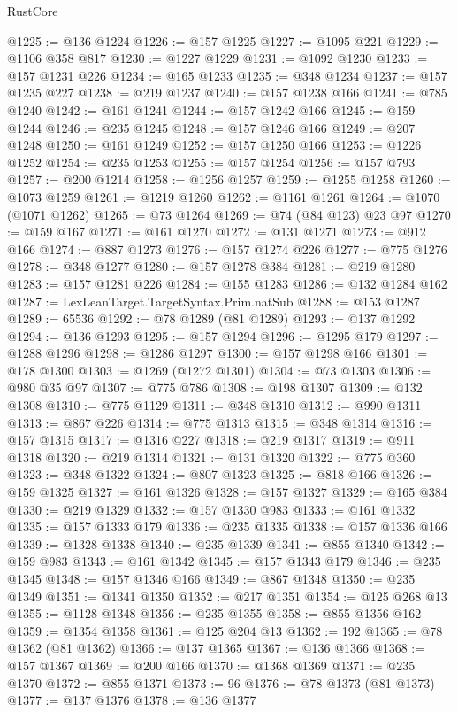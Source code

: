 \begin{lexlean}{RustCore}
\begin{coremodule}
@1225 := @136 @1224
@1226 := @157 @1225
@1227 := @1095 @221
@1229 := @1106 @358 @817
@1230 := @1227 @1229
@1231 := @1092 @1230
@1233 := @157 @1231 @226
@1234 := @165 @1233
@1235 := @348 @1234
@1237 := @157 @1235 @227
@1238 := @219 @1237
@1240 := @157 @1238 @166
@1241 := @785 @1240
@1242 := @161 @1241
@1244 := @157 @1242 @166
@1245 := @159 @1244
@1246 := @235 @1245
@1248 := @157 @1246 @166
@1249 := @207 @1248
@1250 := @161 @1249
@1252 := @157 @1250 @166
@1253 := @1226 @1252
@1254 := @235 @1253
@1255 := @157 @1254
@1256 := @157 @793
@1257 := @200 @1214
@1258 := @1256 @1257
@1259 := @1255 @1258
@1260 := @1073 @1259
@1261 := @1219 @1260
@1262 := @1161 @1261
@1264 := @1070 (@1071 @1262)
@1265 := @73 @1264
@1269 := @74 (@84 @123) @23 @97
@1270 := @159 @167
@1271 := @161 @1270
@1272 := @131 @1271
@1273 := @912 @166
@1274 := @887 @1273
@1276 := @157 @1274 @226
@1277 := @775 @1276
@1278 := @348 @1277
@1280 := @157 @1278 @384
@1281 := @219 @1280
@1283 := @157 @1281 @226
@1284 := @155 @1283
@1286 := @132 @1284 @162
@1287 := LexLeanTarget.TargetSyntax.Prim.natSub
@1288 := @153 @1287
@1289 := 65536
@1292 := @78 @1289 (@81 @1289)
@1293 := @137 @1292
@1294 := @136 @1293
@1295 := @157 @1294
@1296 := @1295 @179
@1297 := @1288 @1296
@1298 := @1286 @1297
@1300 := @157 @1298 @166
@1301 := @178 @1300
@1303 := @1269 (@1272 @1301)
@1304 := @73 @1303
@1306 := @980 @35 @97
@1307 := @775 @786
@1308 := @198 @1307
@1309 := @132 @1308
@1310 := @775 @1129
@1311 := @348 @1310
@1312 := @990 @1311
@1313 := @867 @226
@1314 := @775 @1313
@1315 := @348 @1314
@1316 := @157 @1315
@1317 := @1316 @227
@1318 := @219 @1317
@1319 := @911 @1318
@1320 := @219 @1314
@1321 := @131 @1320
@1322 := @775 @360
@1323 := @348 @1322
@1324 := @807 @1323
@1325 := @818 @166
@1326 := @159 @1325
@1327 := @161 @1326
@1328 := @157 @1327
@1329 := @165 @384
@1330 := @219 @1329
@1332 := @157 @1330 @983
@1333 := @161 @1332
@1335 := @157 @1333 @179
@1336 := @235 @1335
@1338 := @157 @1336 @166
@1339 := @1328 @1338
@1340 := @235 @1339
@1341 := @855 @1340
@1342 := @159 @983
@1343 := @161 @1342
@1345 := @157 @1343 @179
@1346 := @235 @1345
@1348 := @157 @1346 @166
@1349 := @867 @1348
@1350 := @235 @1349
@1351 := @1341 @1350
@1352 := @217 @1351
@1354 := @125 @268 @13
@1355 := @1128 @1348
@1356 := @235 @1355
@1358 := @855 @1356 @162
@1359 := @1354 @1358
@1361 := @125 @204 @13
@1362 := 192
@1365 := @78 @1362 (@81 @1362)
@1366 := @137 @1365
@1367 := @136 @1366
@1368 := @157 @1367
@1369 := @200 @166
@1370 := @1368 @1369
@1371 := @235 @1370
@1372 := @855 @1371
@1373 := 96
@1376 := @78 @1373 (@81 @1373)
@1377 := @137 @1376
@1378 := @136 @1377

\end{coremodule}
\end{lexlean}

